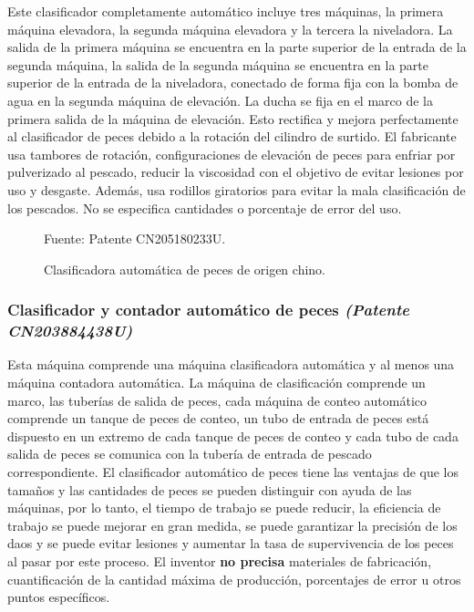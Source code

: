 Este clasificador completamente automático incluye tres máquinas, la primera máquina elevadora, la segunda máquina elevadora y la tercera la niveladora. La salida de la primera máquina se encuentra en la parte superior de la entrada de la segunda máquina, la salida de la segunda máquina se encuentra en la parte superior de la entrada de la niveladora, conectado de forma fija con la bomba de agua en la segunda máquina de elevación. La ducha se fija en el marco de la primera salida de la máquina de elevación. Esto rectifica y mejora perfectamente al clasificador de peces debido a la rotación del cilindro de surtido.\cite{Fang2015} El fabricante usa tambores de rotación, configuraciones de elevación de peces para enfriar por pulverizado al pescado, reducir la viscosidad con el objetivo de evitar lesiones por uso y desgaste. Además, usa rodillos giratorios para evitar la mala clasificación de los pescados. No se especifica cantidades o porcentaje de error del uso.

\begin{figure}[H]
	\centering
	\caption{Clasificadora automática de peces de origen chino.}
	Fuente: Patente CN205180233U.
	\label{fig:clasificadora automatica de peces de origen chino}
\end{figure}

\subsubsection{Clasificador y contador automático de peces \textit{(Patente CN203884438U)}}

Esta máquina comprende una máquina clasificadora automática y al menos una máquina contadora automática. La máquina de clasificación comprende un marco, las tuberías de salida de peces, cada máquina de conteo automático comprende un tanque de peces de conteo, un tubo de entrada de peces está dispuesto en un extremo de cada tanque de peces de conteo y cada tubo de cada salida de peces se comunica con la tubería de entrada de pescado correspondiente. El clasificador automático de peces tiene las ventajas de que los tamaños y las cantidades de peces se pueden distinguir con ayuda de las máquinas, por lo tanto, el tiempo de trabajo se puede reducir, la eficiencia de trabajo se puede mejorar en gran medida, se puede garantizar la precisión de los daos y se puede evitar lesiones y aumentar la tasa de supervivencia de los peces al pasar por este proceso.\cite{Jingwen2014} El inventor \textbf{no precisa} materiales de fabricación, cuantificación de la cantidad máxima de producción, porcentajes de error u otros puntos específicos.

